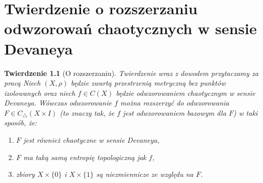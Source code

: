 \documentclass[licencjacka]{pwr_wmat_praca_dyplomowa}
\theoremstyle{plain}
\newtheorem{theorem}{Twierdzenie}
\numberwithin{theorem}{chapter}
\theoremstyle{definition}
\numberwithin{theorem}{chapter}
\begin{document}
\chapter{Twierdzenie o rozszerzaniu odwzorowań chaotycznych w sensie Devaneya}
\begin{theorem}[O rozszerzaniu]\label{twierdzenie_glowne}
Twierdzenie wraz z dowodem przytaczamy za pracą \cite{balibrea2003topological}
Niech $(X, \rho)$ będzie zwartą przestrzenią metryczną bez punktów izolowanych oraz niech $f \in C(X)$ będzie odwzorowaniem chaotycznym w sensie Devaneya. Wówczas odwzorowanie $f$ można rozszerzyć do odwzorowania $F \in C_{\triangle}(X \times I)$ (to znaczy tak, że $f$ jest odwzorowaniem bazowym dla $F$) w taki sposób, że:
\begin{enumerate}[label=(\roman*)]
\item\label{twierdzenie_glowne_a} $F$ jest również chaotyczne w sensie Devaneya, 
\item\label{twierdzenie_glowne_b} $F$ ma taką samą entropię topologiczną jak $f$, 
\item\label{twierdzenie_glowne_c} zbiory $X \times \{0\}$ i $X \times \{1\}$ są niezmiennicze ze względu na $F$.
\end{enumerate}
\end{theorem}
\end{document}
